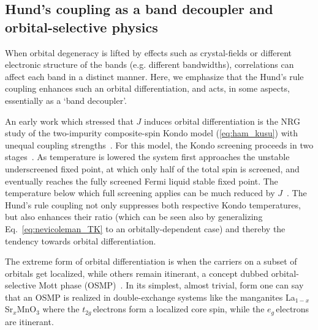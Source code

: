 \documentclass[]{ar2e-changed}%
\def\ttg{$t_{2g}\,$}
\def\eg{$e_{g}\,$}
\begin{document}
\subsection{Hund's coupling as a band decoupler and orbital-selective physics}  
\label{sec:osmt}

%
When orbital degeneracy is lifted by effects such as crystal-fields or different electronic structure of the bands 
(e.g. different bandwidths), correlations can affect each band in a distinct manner.
%
Here, we emphasize that the Hund's rule coupling enhances  such an 
orbital differentiation,  and acts, in some aspects, essentially as a `band decoupler'.

An early work which stressed that $J$ induces orbital differentiation is the
NRG study of the two-impurity composite-spin Kondo model  (\ref{eq:ham_kusu}) 
with unequal coupling strengths~\cite{yotsuhashi01}. 
For this model, the Kondo screening proceeds in two
stages~\cite{jayaprakash81,jones87}. As temperature is lowered the
system first approaches the unstable underscreened fixed point, at 
which only half of the total spin is screened, and eventually reaches the fully
screened Fermi liquid stable fixed point. 
The temperature below which full screening applies can be much reduced by $J$~\cite{jayaprakash81,yotsuhashi01}. 
The Hund's rule coupling not only suppresses both respective
Kondo temperatures, but also enhances their ratio (which can be seen
also by generalizing Eq.~\ref{eq:nevicoleman_TK} to an orbitally-dependent
case) and thereby the tendency towards orbital differentiation.

The extreme form of orbital differentiation is when the carriers on a subset of orbitals get localized,
while others remain itinerant, a concept dubbed
orbital-selective Mott phase (OSMP)~\cite{Anisimov_OSMT}.
% 
In its simplest, almost trivial, form one can say that an OSMP is realized in 
double-exchange systems like the manganites La$_{1-x}$Sr$_x$MnO$_3$ where 
the \ttg electrons form a localized core spin, while the \eg electrons are itinerant. 
\end{document}
